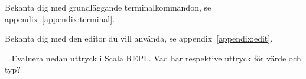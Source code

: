 

\ifPreSolution


\Exercise{\ExeWeekTWO}\label{exe:W02}
\begin{Goals}

\end{Goals}

\begin{Preparations}
\item {}
\item Bekanta dig med grundläggande terminalkommandon, se appendix~\ref{appendix:terminal}.
\item Bekanta dig med den editor du vill använda, se appendix~\ref{appendix:edit}.
\end{Preparations}

\BasicTasks %

\else


\ExerciseSolution{\ExeWeekTWO}


\fi






\QUESTBEGIN

\Task  \what~   Evaluera nedan uttryck i Scala REPL. Vad har respektive uttryck för värde och typ?

\Subtask {}

\Subtask {}

\Subtask {}

\Subtask {}

\Subtask {}

\Subtask {}

\Subtask {}

\Subtask {}

\Subtask {}

\Subtask {}

\Subtask {}

\Subtask {}

\Subtask {}

\Subtask {}

\Subtask {}


